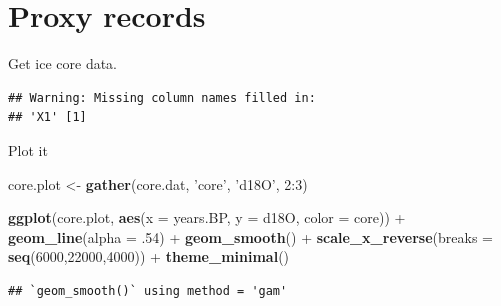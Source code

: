 \documentclass[11pt,]{tufte-handout}
\newenvironment{Shaded}{}{}
\newcommand{\KeywordTok}[1]{\textcolor[rgb]{0.00,0.44,0.13}{\textbf{{#1}}}}
\newcommand{\DataTypeTok}[1]{\textcolor[rgb]{0.56,0.13,0.00}{{#1}}}
\newcommand{\DecValTok}[1]{\textcolor[rgb]{0.25,0.63,0.44}{{#1}}}
\newcommand{\StringTok}[1]{\textcolor[rgb]{0.25,0.44,0.63}{{#1}}}
\newcommand{\NormalTok}[1]{{#1}}
\begin{document}
\section{Proxy records}\label{proxy-records}

Get ice core data.

\begin{Shaded}
\end{Shaded}

\begin{verbatim}
## Warning: Missing column names filled in:
## 'X1' [1]
\end{verbatim}

Plot it

\begin{Shaded}
\begin{Highlighting}[]
\NormalTok{core.plot <-}\StringTok{ }\KeywordTok{gather}\NormalTok{(core.dat, }\StringTok{'core'}\NormalTok{, }\StringTok{'d18O'}\NormalTok{, }\DecValTok{2}\NormalTok{:}\DecValTok{3}\NormalTok{)}

\KeywordTok{ggplot}\NormalTok{(core.plot, }\KeywordTok{aes}\NormalTok{(}\DataTypeTok{x =} \NormalTok{years.BP, }\DataTypeTok{y =} \NormalTok{d18O, }\DataTypeTok{color =} \NormalTok{core)) +}
\StringTok{  }\KeywordTok{geom_line}\NormalTok{(}\DataTypeTok{alpha =} \NormalTok{.}\DecValTok{54}\NormalTok{) +}
\StringTok{  }\KeywordTok{geom_smooth}\NormalTok{() +}
\StringTok{  }\KeywordTok{scale_x_reverse}\NormalTok{(}\DataTypeTok{breaks =} \KeywordTok{seq}\NormalTok{(}\DecValTok{6000}\NormalTok{,}\DecValTok{22000}\NormalTok{,}\DecValTok{4000}\NormalTok{)) +}
\StringTok{  }\KeywordTok{theme_minimal}\NormalTok{()}
\end{Highlighting}
\end{Shaded}

\begin{verbatim}
## `geom_smooth()` using method = 'gam'
\end{verbatim}
\end{document}
